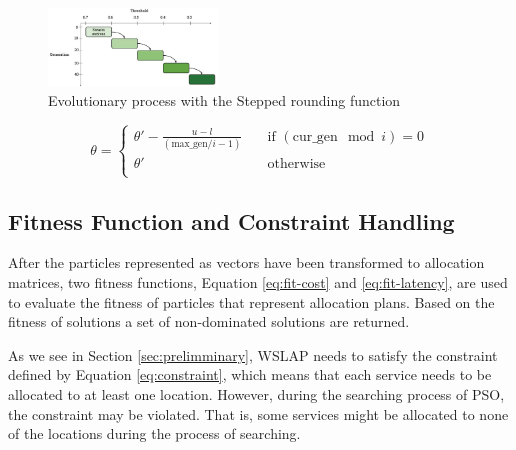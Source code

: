 \documentclass[10pt,journal,compsoc]{IEEEtran}
\begin{document}
\begin{figure}[H]
 \centering
   \includegraphics[width=0.4\textwidth]{pics/transfer.eps}
   \caption{Evolutionary process with the Stepped rounding function}
   \label{fig:adaptive}
 \end{figure}

\begin{small}
\begin{equation}
\label{eq:transfer}
  \theta =
  \begin{cases}
   \theta' - \frac{u - l}{(\text{max\_gen}/i - 1)} & \quad \text{if } (\text{cur\_gen}\mod i) = 0\\
   \theta' & \quad \text{otherwise} \\
  \end{cases}
\end{equation}
\end{small}

\vspace{-3 mm}
\subsection{Fitness Function and Constraint Handling}

After the particles represented as vectors have been transformed to allocation matrices, two fitness functions, Equation \ref{eq:fit-cost} and \ref{eq:fit-latency},  are used to evaluate the fitness of particles that represent allocation plans. Based on the fitness of solutions a set of non-dominated solutions are returned.

As we see in Section \ref{sec:prelimminary}, WSLAP needs to satisfy the constraint defined by Equation \ref{eq:constraint}, which means that each service needs to be allocated to at least one location. However, during the searching process of PSO, the constraint may be violated. That is, some services might be allocated to none of the locations during the process of searching.


\end{document}
